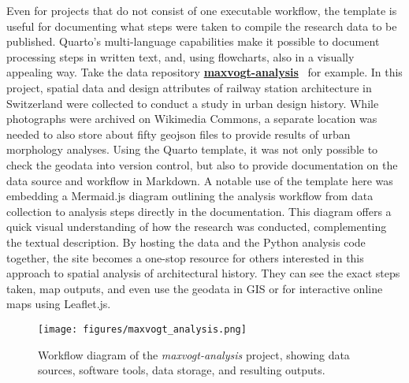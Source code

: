 \documentclass[final]{anthology-ch} %
\begin{document}
Even for projects that do not consist of one executable workflow, the template is useful for documenting what steps were taken to compile the research data to be published. Quarto's multi-language capabilities make it possible to document processing steps in written text, and, using flowcharts, also in a visually appealing way. Take the data repository \href{https://mtwente.github.io/maxvogt-analysis}{\textbf{maxvogt-analysis}}~\cite{twente2024} for example. In this project, spatial data and design attributes of railway station architecture in Switzerland were collected to conduct a study in urban design history. While photographs were archived on Wikimedia Commons, a separate location was needed to also store about fifty geojson files to provide results of urban morphology analyses. Using the Quarto template, it was not only possible to check the geodata into version control, but also to provide documentation on the data source and workflow in Markdown. A notable use of the template here was embedding a Mermaid.js diagram outlining the analysis workflow from data collection to analysis steps directly in the documentation. This diagram offers a quick visual understanding of how the research was conducted, complementing the textual description. By hosting the data and the Python analysis code together, the site becomes a one-stop resource for others interested in this approach to spatial analysis of architectural history. They can see the exact steps taken, map outputs, and even use the geodata in GIS or for interactive online maps using Leaflet.js.

\begin{figure}[t!]
  \centering
  \texttt{[image: figures/maxvogt\_analysis.png]}
  \caption{Workflow diagram of the \emph{maxvogt-analysis} project, showing data sources, software tools, data storage, and resulting outputs.}
  \label{fig-max-vogt}
\end{figure}
\end{document}
